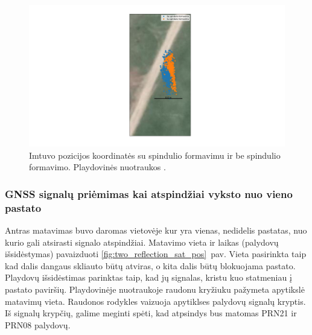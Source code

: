 \documentclass[main.tex]{subfiles}
\begin{document}
\begin{figure}[ht]
    \begin{centering}
    \hspace*{-3cm}\includegraphics[scale=0.45]{drawings/no_reflection_map}
    \par\end{centering}
    \protect\caption{\label{fig:no_reflection_map}Imtuvo pozicijos koordinatės su spindulio formavimu ir be spindulio formavimo. Playdovinės nuotraukos \cite{google_maps}.}
\end{figure}



\subsubsection{GNSS signalų priėmimas kai atspindžiai vyksto nuo vieno pastato}\label{sec:gnss_meas_one_reflection}

Antras matavimas buvo daromas vietovėje kur yra vienas, nedidelis pastatas, nuo kurio gali atsirasti
signalo atspindžiai. Matavimo vieta ir laikas (palydovų išsidėstymas) pavaizduoti \ref{fig:two_reflection_sat_pos}~pav.
Vieta pasirinkta taip kad dalis dangaus skliauto būtų atviras, o kita dalis būtų blokuojama pastato.
Playdovų išsidėstimas parinktas taip, kad jų signalas, kristu kuo statmeniau į pastato paviršių.
Playdovinėje nuotraukoje raudonu kryžiuku pažymeta apytikslė matavimų vieta. Raudonos rodykles
vaizuoja apytiklses palydovų signalų kryptis. Iš signalų krypčių, galime meginti spėti,
kad atpsindys bus matomas PRN21 ir PRN08 palydovų.
\end{document}
